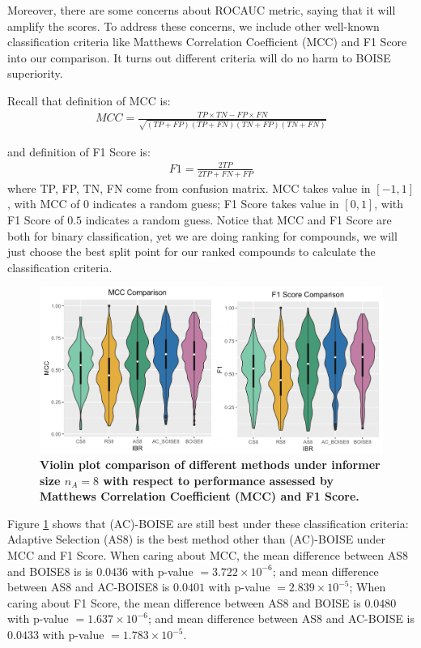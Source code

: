\documentclass[12pt]{article}
\begin{document}
Moreover, there are some concerns about ROCAUC metric, saying that it will amplify the scores. To address these concerns, we include other well-known classification criteria like Matthews Correlation Coefficient (MCC) and F1 Score into our comparison. It turns out different criteria will do no harm to BOISE superiority. 

Recall that definition of MCC is:
\begin{eqnarray}
\label{eq:mcc}
MCC = \frac{TP\times TN-FP\times FN}{\sqrt{(TP+FP)(TP+FN)(TN+FP)(TN+FN)}}
\end{eqnarray}

and definition of F1 Score is:
\begin{eqnarray}
\label{eq:F1}
F1 = \frac{2TP}{2TP+FN+FP}
\end{eqnarray}
where TP, FP, TN, FN come from confusion matrix. MCC takes value in $[-1,1]$, with MCC of $0$ indicates a random guess; F1 Score takes value in $[0,1]$, with F1 Score of $0.5$ indicates a random guess. Notice that MCC and F1 Score are both for binary classification, yet we are doing ranking for compounds, we will just choose the best split point for our ranked compounds to calculate the classification criteria. 


\begin{figure}[!ht]
\centering
\includegraphics[width=5.0in]{PKIS1_8_mccf1.png}
\caption{\label{fig:mcc} 
{\bf Violin plot comparison of different methods under informer size $n_A =8$ with respect to performance assessed by Matthews Correlation Coefficient (MCC) and F1 Score.} }
\end{figure}


Figure \ref{fig:mcc} shows that (AC)-BOISE are still best under these classification criteria: Adaptive Selection (AS8) is the best method other than (AC)-BOISE  under MCC and F1 Score. When caring about MCC, the mean difference between AS8 and BOISE8 is is $0.0436$ with p-value $=3.722\times 10^{-6}$; and  mean difference between AS8 and AC-BOISE8 is $0.0401$ with p-value $=2.839\times 10^{-5}$; When caring about F1 Score, the mean difference between AS8 and BOISE is $0.0480$ with p-value $=1.637\times 10^{-6}$; and  mean difference between AS8 and AC-BOISE is $0.0433$ with p-value $=1.783\times 10^{-5}$.
\end{document}

